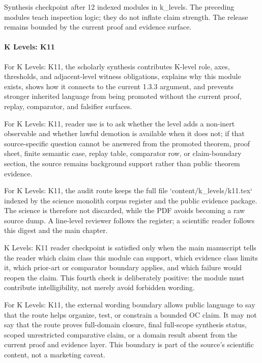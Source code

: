 Synthesis checkpoint after 12 indexed modules in k\_levels. The preceding modules teach inspection logic; they do not inflate claim strength. The release remains bounded by the current proof and evidence surface.


\paragraph{K Levels: K11}

For K Levels: K11, the scholarly synthesis contributes K-level role, axes, thresholds, and adjacent-level witness obligations, explains why this module exists, shows how it connects to the current 1.3.3 argument, and prevents stronger inherited language from being promoted without the current proof, replay, comparator, and falsifier surfaces.


For K Levels: K11, reader use is to ask whether the level adds a non-inert observable and whether lawful demotion is available when it does not; if that source-specific question cannot be answered from the promoted theorem, proof sheet, finite semantic case, replay table, comparator row, or claim-boundary section, the source remains background support rather than public theorem evidence.


For K Levels: K11, the audit route keeps the full file `content/k\_levels/k11.tex` indexed by the science monolith corpus register and the public evidence package. The science is therefore not discarded, while the PDF avoids becoming a raw source dump. A line-level reviewer follows the register; a scientific reader follows this digest and the main chapter.


K Levels: K11 reader checkpoint is satisfied only when the main manuscript tells the reader which claim class this module can support, which evidence class limits it, which prior-art or comparator boundary applies, and which failure would reopen the claim. This fourth check is deliberately positive: the module must contribute intelligibility, not merely avoid forbidden wording.


For K Levels: K11, the external wording boundary allows public language to say that the route helps organize, test, or constrain a bounded OC claim. It may not say that the route proves full-domain closure, final full-scope synthesis status, scoped unrestricted comparative claim, or a domain result absent from the current proof and evidence layer. This boundary is part of the source's scientific content, not a marketing caveat.


